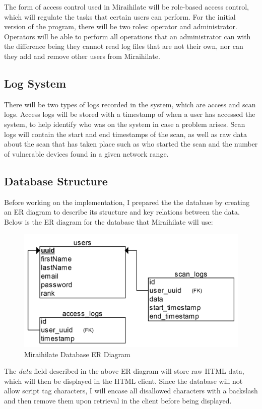 \vspace{0.5cm}

The form of access control used in Miraihilate will be role-based access control, which will regulate the tasks that certain users can perform. For the initial version of the program, there will be two roles: operator and administrator. Operators will be able to perform all operations that an administrator can with the difference being they cannot read log files that are not their own, nor can they add and remove other users from Miraihilate.

\subsection{Log System}

There will be two types of logs recorded in the system, which are access and scan logs. Access logs will be stored with a timestamp of when a user has accessed the system, to help identify who was on the system in case a problem arises. Scan logs will contain the start and end timestamps of the scan, as well as raw data about the scan that has taken place such as who started the scan and the number of vulnerable devices found in a given network range.

\subsection{Database Structure}

Before working on the implementation, I prepared the the database by creating an ER diagram to describe its structure and key relations between the data. Below is the ER diagram for the database that Miraihilate will use:

\begin{figure}[h]
	\centering
	\includegraphics[width=0.75\linewidth]{img/miraihilate_erd_4x.png}
	\caption{Miraihilate Database ER Diagram}
\end{figure}

The \textit{data} field described in the above ER diagram will store raw HTML data, which will then be displayed in the HTML client. Since the database will not allow script tag characters, I will encase all disallowed characters with a backslash and then remove them upon retrieval in the client before being displayed.
